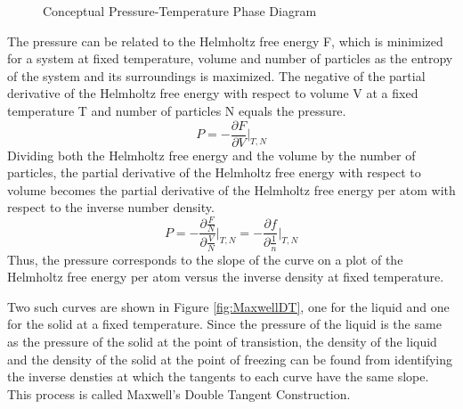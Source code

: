 \documentclass[double,12pt]{beavtex}
\begin{document}
\begin{figure}[h!]
    \centering
    \caption{Conceptual Pressure-Temperature Phase Diagram}
    \label{fig:P-T_Diagram}
  \end{figure}
The pressure can be related to the Helmholtz free energy F, which is minimized for a system at fixed temperature, volume and number of particles as the entropy of the system and its surroundings is maximized. The negative of the partial derivative of the Helmholtz free energy with respect to volume V at a fixed temperature T and number of particles N equals the pressure. 
\begin{equation}{P=-\frac{\partial{F}}{\partial{V}}\bigg|_{T,N}}\end{equation}
\noindent Dividing both the Helmholtz free energy and the volume by the number of particles, the partial derivative of the Helmholtz free energy with respect to volume becomes the partial derivative of the Helmholtz free energy per atom with respect to the inverse number density. \begin{equation}{P=-\frac{\partial{\frac{F}{N}}}{\partial{\frac{V}{N}}}\bigg|_{T,N} = -\frac{\partial{f}}{\partial{\frac{1}{n}}}\bigg|_{T,N}}\end{equation} Thus, the pressure corresponds to the slope of the curve on a plot of the Helmholtz free energy per atom versus the inverse density at fixed temperature. 

Two such curves are shown in Figure \ref{fig:MaxwellDT}, one for the liquid and one for the solid at a fixed temperature. Since the pressure of the liquid is the same as the pressure of the solid at the point of transistion, the density of the liquid and the density of the solid at the point of freezing can be found from identifying the inverse densties at which the tangents to each curve have the same slope. This process is called Maxwell's Double Tangent Construction. 
\end{document}
